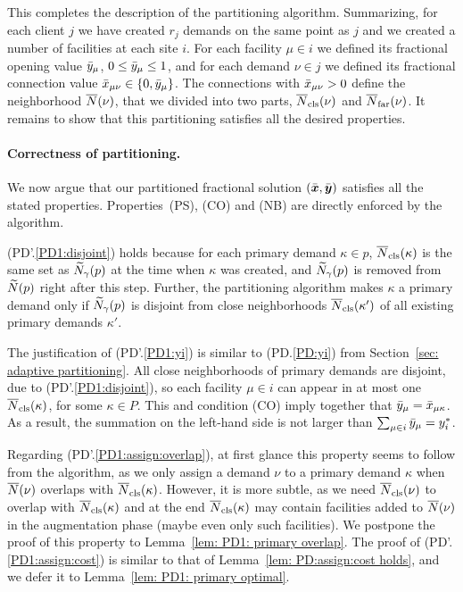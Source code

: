 This completes the description of the partitioning algorithm. Summarizing, for 
each client $j$ we have created $r_j$ demands on the same point as $j$ and
we created a number of facilities at each site $i$. 
For each facility $\mu\in i$ we defined its fractional opening value ${\bar y}_\mu$, $0\le {\bar y}_\mu\le 1$,
and for each demand $\nu\in j$ we defined its fractional connection value ${\bar x}_{\mu\nu}\in { \left\{ 0,{\bar y}_\mu \right\} }$.
The connections with ${\bar x}_{\mu\nu} > 0$ define the neighborhood ${\overline{N}}(\nu)$, that we divided into two parts,
${\overline{N}}_{\text{cls}}(\nu)$ and ${\overline{N}}_{\text{far}}(\nu)$. It remains to show that this partitioning
satisfies all the desired properties.


\medskip
\paragraph{Correctness of partitioning.}
We now argue that our partitioned fractional solution $(\bar{\boldsymbol{x}},\bar{\boldsymbol{y}})$
satisfies all the stated properties. Properties~(PS), (CO) and (NB) are
directly enforced by the algorithm.

(PD'.\ref{PD1:disjoint}) holds because for each primary demand $\kappa\in p$, 
${\overline{N}}_{\text{cls}}(\kappa)$ is the same set as ${\widetilde N}_{\gamma}(p)$ at the time when
$\kappa$ was created, and ${\widetilde N}_{\gamma}(p)$ is removed from ${\widetilde N}(p)$
right after this step. Further, the partitioning algorithm makes $\kappa$ a primary demand
only if ${\widetilde N}_{\gamma}(p)$ is disjoint from close neighborhoods
${\overline{N}}_{\text{cls}}(\kappa')$ of all existing primary demands $\kappa'$.

The justification of (PD'.\ref{PD1:yi}) is similar to (PD.\ref{PD:yi}) from
Section~\ref{sec: adaptive partitioning}. All close neighborhoods of
primary demands are disjoint, due to (PD'.\ref{PD1:disjoint}), so
each facility $\mu \in i$ can appear in at most one
${\overline{N}}_{\text{cls}}(\kappa)$, for some $\kappa\in P$. This and condition (CO) imply together
that ${\bar y}_{\mu} = {\bar x}_{\mu\kappa}$. As a result, the
summation on the left-hand side is not larger than 
$\sum_{\mu\in i}{\bar y}_{\mu} = y_i^\ast$. 

Regarding (PD'.\ref{PD1:assign:overlap}), at first glance this
property seems to follow from the algorithm, as we only assign a
demand $\nu$ to a primary demand $\kappa$ when ${\overline{N}}(\nu)$ overlaps
with ${\overline{N}}_{\text{cls}}(\kappa)$.  However, it is more subtle, as we need
${\overline{N}}_{\text{cls}}(\nu)$ to overlap with ${\overline{N}}_{\text{cls}}(\kappa)$ and at the end
${\overline{N}}_{\text{cls}}(\kappa)$ may contain facilities added to ${\overline{N}}(\nu)$ in
the augmentation phase (maybe even only such facilities). We postpone
the proof of this property to Lemma~\ref{lem: PD1: primary overlap}.
The proof of (PD'.\ref{PD1:assign:cost}) is similar to that of
Lemma~\ref{lem: PD:assign:cost holds}, and we defer it to
Lemma~\ref{lem: PD1: primary optimal}.


